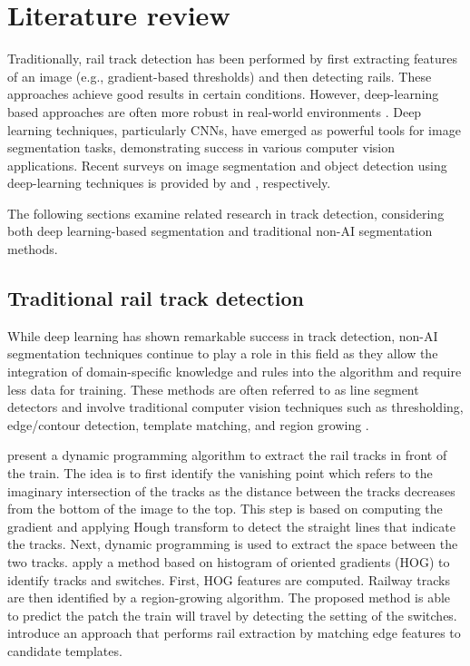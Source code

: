 \documentclass[Master,MDS,english]{BASE/twbook} %
\begin{document}
\chapter{Literature review} %

Traditionally, rail track detection has been performed by first extracting features of an image (e.g., gradient-based thresholds) and then detecting rails. These approaches achieve good results in certain conditions. However, deep-learning based approaches are often more robust in real-world environments \citep{7350873, 8859360, 10.1145/3503161.3548050}.
Deep learning techniques, particularly CNNs, have emerged as powerful tools for image segmentation tasks, demonstrating success in various computer vision applications. Recent surveys on image segmentation and object detection using deep-learning techniques is provided by \cite{cmc.2023.032757} and \cite{ZAIDI2022103514}, respectively.

The following sections examine related research in track detection, considering both deep learning-based segmentation and traditional non-AI segmentation methods.



\section{Traditional rail track detection}

While deep learning has shown remarkable success in track detection, non-AI segmentation techniques continue to play a role in this field as they allow the integration of domain-specific knowledge and rules into the algorithm and require less data for training. These methods are often referred to as line segment detectors and involve traditional computer vision techniques such as thresholding, edge/contour detection, template matching, and region growing \citep{4731268, ipol.2012.gjmr-lsd, 8100103, SAHOO1988233, Mittal2022}.

\cite{5309526} present a dynamic programming algorithm to extract the rail tracks in front of the train. The idea is to first identify the vanishing point which refers to the imaginary intersection of the tracks as the distance between the tracks decreases from the bottom of the image to the top.  This step is based on computing the gradient and applying Hough transform to detect the straight lines that indicate the tracks. Next, dynamic programming is used to extract the space between the two tracks.
 \cite{qi2013efficient} apply a method based on histogram of oriented gradients (HOG) to identify tracks and switches. First, HOG features are computed.  Railway tracks are then identified by a region-growing algorithm. The proposed method is able to predict the patch the train will travel by detecting the setting of the switches. 
\cite{5940410} introduce an approach that performs rail extraction by matching edge features to candidate templates.
\end{document}

